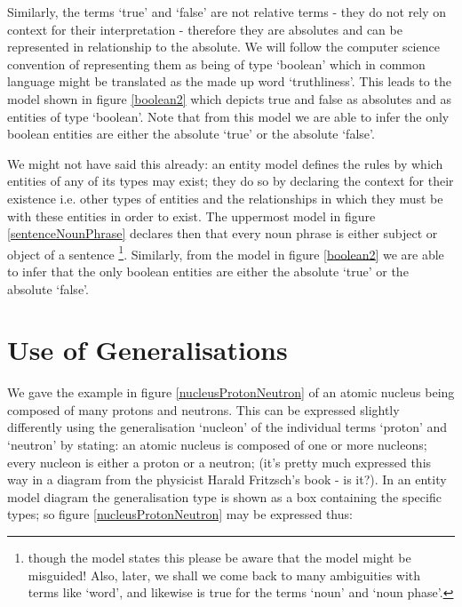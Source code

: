 
\noindent Similarly, the terms `true' and `false' are not relative terms - they do not rely
 on context for their  interpretation - therefore they are absolutes and can be represented in relationship to the absolute.  
We will follow the computer science convention of representing them as being of 
type `boolean' which in  common language might be translated as the made up word `truthliness'. 
This leads to the model shown in 
figure \ref{boolean2} which depicts true and false as absolutes and as entities of type `boolean'. 
Note that from this model we are able to infer the only boolean entities are either the absolute `true' or  the absolute `false'. 


\noindent We might not have said this already: an entity model defines the rules 
by which entities of any of its types may exist; they do so by declaring the context 
for their existence i.e. other types of entities and the relationships in which they must 
be with these entities in order to exist. The uppermost model in figure \ref{sentenceNounPhrase} 
declares then that every noun phrase is either subject or object of a sentence
\footnote{though 
the model states this please be aware that the model might be misguided! Also, later, we 
shall we come back to many ambiguities with terms like `word', and likewise is true for the 
terms `noun' and `noun phase'.}. Similarly, from the model in figure \ref{boolean2} we are able to 
infer that the only boolean entities are either the absolute `true' or the absolute `false'. 

\section {Use of Generalisations}
We gave the example in figure \ref{nucleusProtonNeutron} of an atomic nucleus being composed of many protons and neutrons.
This can be expressed slightly differently using the generalisation `nucleon' of the individual terms `proton' and `neutron'
by stating: an atomic nucleus is composed of one or more nucleons; every nucleon is either a proton or a neutron;
(it's pretty much expressed this way in a diagram from the physicist Harald Fritzsch's book - is it?). 
In an entity model diagram the generalisation type 
is shown as a box containing the specific types; so figure \ref{nucleusProtonNeutron} may be expressed thus:

